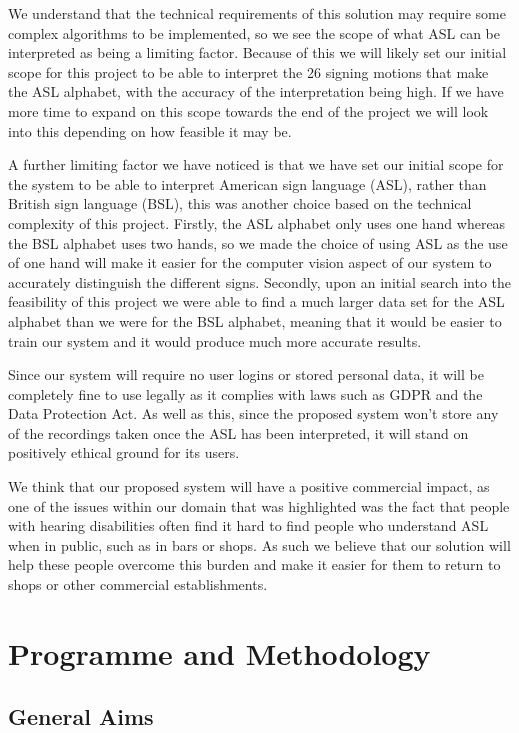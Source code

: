 \documentclass[10pt]{article}
\begin{document}
We understand that the technical requirements of this solution may require some complex algorithms 
to be implemented, so we see the scope of what ASL can be interpreted as being a limiting factor. 
Because of this we will likely set our initial scope for this project to be able to interpret the
26 signing motions that make the ASL alphabet, with the accuracy of the interpretation being high.
If we have more time to expand on this scope towards the end of the project we will look into this 
depending on how feasible it may be.

A further limiting factor we have noticed is that we have set our initial scope for the system to be 
able to interpret American sign language (ASL), rather than British sign language (BSL), this was 
another choice based on the technical complexity of this project. Firstly, the ASL alphabet only 
uses one hand whereas the BSL alphabet uses two hands, so we made the choice of using ASL as the use 
of one hand will make it easier for the computer vision aspect of our system to accurately 
distinguish the different signs. Secondly, upon an initial search into the feasibility of this 
project we were able to find a much larger data set for the ASL alphabet than we were for the BSL 
alphabet, meaning that it would be easier to train our system and it would produce much more 
accurate results. 

Since our system will require no user logins or stored personal data, it will be completely fine to 
use legally as it complies with laws such as GDPR and the Data Protection Act. As well as this, 
since the proposed system won't store any of the recordings taken once the ASL has been interpreted, 
it will stand on positively ethical ground for its users.

We think that our proposed system will have a positive commercial impact, as one of the issues 
within our domain that was highlighted was the fact that people with hearing disabilities often find 
it hard to find people who understand ASL when in public, such as in bars or shops. As such we 
believe that our solution will help these people overcome this burden and make it easier for them to 
return to shops or other commercial establishments.

\section{Programme and Methodology}
\subsection{General Aims}
\end{document}
